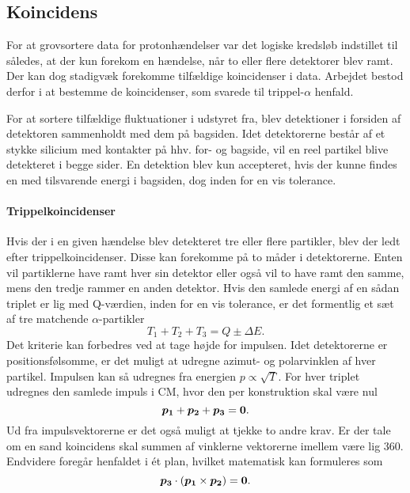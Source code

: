 \subsection{Koincidens}
\label{sec:koincidens}
For at grovsortere data for protonhændelser var det logiske kredsløb indstillet til \lAND således,
at der kun forekom en hændelse, når to eller flere detektorer blev ramt. Der kan dog stadigvæk
forekomme tilfældige koincidenser i data. Arbejdet bestod derfor i at bestemme de
koincidenser, som svarede til trippel-$\alpha$ henfald.

For at sortere tilfældige fluktuationer i udstyret fra, blev detektioner i forsiden af detektoren
sammenholdt med dem på bagsiden. Idet detektorerne består af et stykke silicium med kontakter på
hhv. for- og bagside, vil en reel partikel blive detekteret i begge sider. En detektion blev kun
accepteret, hvis der kunne findes en med tilsvarende energi i bagsiden, dog inden for en vis
tolerance.

\paragraph{Trippelkoincidenser}
\label{sec:trippelkoincidenser}
Hvis der i en given hændelse blev detekteret tre eller flere partikler, blev der ledt efter
trippelkoincidenser. Disse kan forekomme på to måder i detektorerne. Enten vil partiklerne have ramt
hver sin detektor eller også vil to have ramt den samme, mens den tredje rammer en anden
detektor. Hvis den samlede energi af en sådan triplet er lig med Q-værdien, inden for en vis
tolerance, er det formentlig et sæt af tre matchende $\alpha$-partikler
\begin{equation}
  \label{eq:trippelE}
  T_{1} + T_{2} + T_{3} = Q \pm \Delta E.
\end{equation}
Det kriterie kan forbedres ved at tage højde for impulsen. Idet detektorerne er positionsfølsomme, er
det muligt at udregne azimut- og polarvinklen af hver partikel. Impulsen kan så udregnes fra
energien $p \propto \sqrt{T}$. For hver triplet udregnes den samlede impuls i CM, hvor den per
konstruktion skal være nul
\begin{equation}
  \label{eq:pCMnul}
  \bm{p_{1}} + \bm{p_{2}} + \bm{p_{3}} = \bm{0}.
\end{equation}
Ud fra impulsvektorerne er det også muligt at tjekke to andre krav. Er der tale om en sand
koincidens skal summen af vinklerne vektorerne imellem være lig 360\degree. Endvidere foregår
henfaldet i ét plan, hvilket matematisk kan formuleres som
\begin{equation}
  \bm{p_{3}} \cdot (\bm{p_{1}} \times \bm{p_{2}}) = \bm{0}.
\end{equation}

